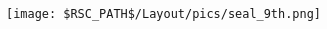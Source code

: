 \begin{titlepage}
\begin{center}
{\begin{multicols}{2}
\tocsecondcolumn

\vspace*{\fill}\end{multicols}

}
\fi
\fi

\vfill

\ifdefined\thisistherulebook

\strut

\else

\begin{minipage}{2cm}
	\texttt{[image: \$RSC\_PATH\$/Layout/pics/seal\_9th.png]}
\end{minipage}\hspace{10pt}\begin{minipage}{15cm-10pt}
	{\fontsize{10}{12}\selectfont\greytextcolor{%
	\ifdefined\thisisthepathsbook%
		\noindent\frontpagecreditswithoutblue%
	\else
		\ifdefined\thisisasupplement%
			\noindent\frontpagecreditsnohowtoread%
		\else%
			\ifdefined\thisisasupplementarmy%
				\noindent\frontpagecreditssuppl%
			\else%
				\noindent\frontpagecredits%
			\fi%
		\fi%
	\fi%
	\newline\license{} \latexcredit{}}\par}
\end{minipage}

\fi

\end{center}
\end{titlepage}

\setcounter{page}{2}

